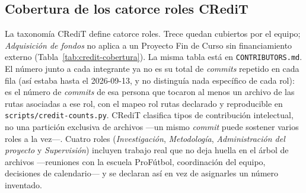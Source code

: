 \documentclass[11pt,a4paper]{article}
\newcommand{\ruta}[1]{\texttt{\footnotesize #1}}
\begin{document}
\subsection{Cobertura de los catorce roles CRediT}

La taxonomía CRediT define catorce roles. Trece quedan cubiertos por el
equipo; \emph{Adquisición de fondos} no aplica a un Proyecto Fin de Curso
sin financiamiento externo (Tabla~\ref{tab:credit-cobertura}). La misma
tabla está en \ruta{CONTRIBUTORS.md}. El número junto a cada integrante
ya no es su total de \emph{commits} repetido en cada fila (así estaba
hasta el 2026-09-13, y no distinguía nada específico de cada rol): es el
número de \emph{commits} de esa persona que tocaron al menos un archivo
de las rutas asociadas a ese rol, con el mapeo rol\,\textrightarrow\,rutas
declarado y reproducible en \texttt{scripts/credit-counts.py}. CRediT
clasifica tipos de contribución intelectual, no una partición exclusiva
de archivos —un mismo \emph{commit} puede sostener varios roles a la
vez—. Cuatro roles (\emph{Investigación}, \emph{Metodología},
\emph{Administración del proyecto} y \emph{Supervisión}) incluyen trabajo
real que no deja huella en el árbol de archivos —reuniones con la
escuela ProFútbol, coordinación del equipo, decisiones de calendario— y
se declaran así en vez de asignarles un número inventado.
\end{document}
